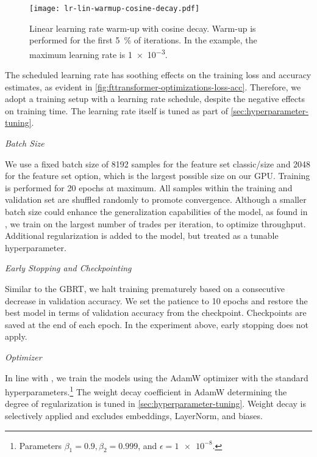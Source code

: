 \begin{figure}[!ht]
    \centering
    \texttt{[image: lr-lin-warmup-cosine-decay.pdf]}
    \caption[Linear Learning Rate Warm-Up With Cosine Decay]{Linear learning rate warm-up with cosine decay. Warm-up is performed for the first \SI{5}{\percent} of iterations. In the example, the maximum learning rate is \num{1e-3}.}
    \label{fig:lr-lin-warmup-cosine-decay}
\end{figure}

The scheduled learning rate has soothing effects on the training loss and accuracy estimates, as evident in \cref{fig:fttransformer-optimizations-loss-acc}. Therefore, we adopt a training setup with a learning rate schedule, despite the negative effects on training time. The learning rate itself is tuned as part of \cref{sec:hyperparameter-tuning}.


\emph{Batch Size}

We use a fixed batch size of \num{8192} samples for the feature set classic/size and \num{2048} for the feature set option, which is the largest possible size on our \gls{GPU}. Training is performed for \num{20} epochs at maximum. All samples within the training and validation set are shuffled randomly to promote convergence. Although a smaller batch size could enhance the generalization capabilities of the model, as found in \textcite[][3]{keskarLargeBatchTrainingDeep2017}, we train on the largest number of trades per iteration, to optimize throughput. Additional regularization is added to the model, but treated as a tunable hyperparameter.

\emph{Early Stopping and Checkpointing}

Similar to the \gls{GBRT}, we halt training prematurely based on a consecutive decrease in validation accuracy. We set the patience to \num{10} epochs and restore the best model in terms of validation accuracy from the checkpoint. Checkpoints are saved at the end of each epoch. In the experiment above, early stopping does not apply.

\emph{Optimizer}

In line with \textcite[][6]{gorishniyRevisitingDeepLearning2021}, we train the models using the AdamW optimizer \autocite[][2--3]{loshchilovDecoupledWeightDecay2019} with the standard hyperparameters.\footnote{Parameters $\beta_{1}=0.9, \beta_{2}=0.999$, and $\epsilon = \num{1e-8}$.} The weight decay coefficient in AdamW determining the degree of regularization is tuned in \cref{sec:hyperparameter-tuning}. Weight decay is selectively applied and excludes embeddings, LayerNorm, and biases.

